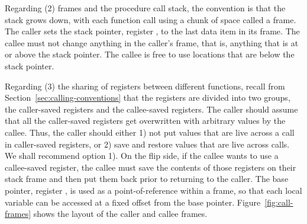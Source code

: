 \documentclass[11pt]{book}
\begin{document}
Regarding (2) frames and the procedure call stack, the convention is
that the stack grows down, with each function call using a chunk of
space called a frame. The caller sets the stack pointer, register
, to the last data item in its frame. The callee must not
change anything in the caller's frame, that is, anything that is at or
above the stack pointer. The callee is free to use locations that are
below the stack pointer. 

Regarding (3) the sharing of registers between different functions,
recall from Section~\ref{sec:calling-conventions} that the registers
are divided into two groups, the caller-saved registers and the
callee-saved registers. The caller should assume that all the
caller-saved registers get overwritten with arbitrary values by the
callee. Thus, the caller should either 1) not put values that are live
across a call in caller-saved registers, or 2) save and restore values
that are live across calls. We shall recommend option 1).  On the flip
side, if the callee wants to use a callee-saved register, the callee
must save the contents of those registers on their stack frame and
then put them back prior to returning to the caller.  The base
pointer, register , is used as a point-of-reference within a
frame, so that each local variable can be accessed at a fixed offset
from the base pointer.
%
Figure~\ref{fig:call-frames} shows the layout of the caller and callee
frames.
\end{document}
